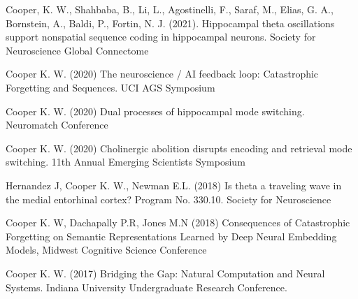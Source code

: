 \documentclass[10pt]{cooperCV2}
\begin{document}
\begin{etaremune}[itemindent=-\bibhang, topsep=0pt,
				   itemsep=\bibsep,partopsep=0pt,parsep=0pt,leftmargin={\bibhang+\widthof{[999]}}] 
    \item  Cooper, K. W., Shahbaba, B., Li, L., Agostinelli, F., Saraf, M., Elias, G. A., Bornstein, A., Baldi, P.,  Fortin, N. J. (2021). Hippocampal theta oscillations support nonspatial sequence coding in hippocampal neurons. Society for Neuroscience Global Connectome


    \item  Cooper K. W. (2020) The neuroscience / AI feedback loop: Catastrophic Forgetting and Sequences. UCI AGS Symposium


    \item Cooper K. W. (2020) Dual processes of hippocampal mode switching. Neuromatch Conference

    \item Cooper K. W. (2020) Cholinergic abolition disrupts encoding and retrieval mode switching. 11th Annual Emerging Scientists Symposium

    \item Hernandez J, Cooper K. W., Newman E.L. (2018) Is theta a traveling wave in the medial entorhinal cortex? Program No. 330.10. Society for Neuroscience

    \item Cooper K. W, Dachapally P.R, Jones M.N (2018) Consequences of Catastrophic Forgetting on Semantic Representations Learned by Deep Neural Embedding Models, Midwest Cognitive Science Conference

    \item Cooper K. W. (2017) Bridging the Gap: Natural Computation and Neural Systems. Indiana University Undergraduate Research Conference.

\end{etaremune}


%
%



\end{document}

